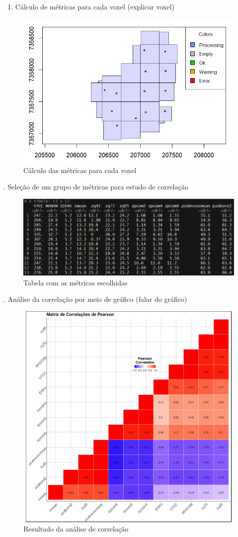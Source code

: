 \documentclass[
]{article}
\providecommand{\tightlist}{%
  \setlength{\itemsep}{0pt}\setlength{\parskip}{0pt}}
\begin{document}
\begin{enumerate}
\def\labelenumi{\arabic{enumi}.}
\setcounter{enumi}{10}
\tightlist
\item
  Cálculo de métricas para cada voxel (explicar voxel)
\end{enumerate}

\begin{figure}

{\centering \includegraphics[width=0.5\linewidth]{IMAGES/calculo-metricas-voxel} 

}

\caption{Cálculo das métricas para cada voxel}\label{fig:unnamed-chunk-15}
\end{figure}

. Seleção de um grupo de métricas para estudo de correlação

\begin{figure}

{\centering \includegraphics[width=0.5\linewidth]{IMAGES/tb-subgrupo-de-metricas-p-analise} 

}

\caption{Tabela com as métricas escolhidas}\label{fig:unnamed-chunk-16}
\end{figure}

. Análise da correlação por meio de gráfico (falar do gráfico)

\begin{figure}

{\centering \includegraphics[width=0.5\linewidth]{IMAGES/MatrizDeCorrelacoes} 

}

\caption{Resultado da análise de correlação}\label{fig:unnamed-chunk-17}
\end{figure}
\end{document}
